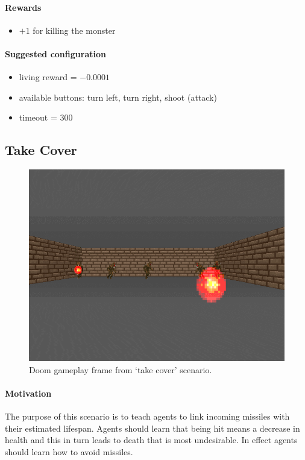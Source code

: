 \documentclass[english,bachelor,a4paper,twoside]{ppfcmthesis}
\begin{document}
		\paragraph{Rewards}
		\begin{itemize}
			\item $+1$ for killing the monster
		\end{itemize}
		
		\paragraph{Suggested configuration}
		\begin{itemize}
			\item living reward = $-0.0001$
			\item available buttons: turn left, turn right, shoot (attack)
			\item timeout = 300
		\end{itemize}
	\newpage

	\subsection{Take Cover}
		\begin{figure}
			\centering
			\includegraphics[scale=0.5]{take_cover.png}
			\caption{Doom gameplay frame from `take cover' scenario.}
		\end{figure}
		\paragraph{Motivation} 
			The purpose of this scenario is to teach agents to link incoming missiles with their estimated lifespan. Agents should learn that being hit means a decrease in health and this in turn leads to death that is most undesirable. In effect agents should learn how to avoid missiles.
\end{document}
